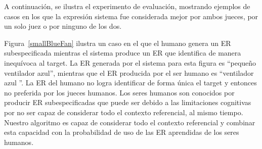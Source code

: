

A continuaci\'on, se ilustra el experimento de evaluaci\'on, mostrando ejemplos de casos en los que la expresi\'on sistema fue considerada mejor por ambos jueces, por un solo juez o por ninguno de los dos.

Figura~\ref{smallBlueFan} ilustra un caso en el que el humano genera un ER subespecificada mientras el sistema produce un ER que identifica de manera inequ\'{i}voca al target. La ER generada por el sistema para esta figura es ``peque\~no ventilador azul'', mientras que el ER producida por el ser humano es ``ventilador azul ''. La ER del humano no logra identificar de forma \'unica el target y entonces no preferida por los jueces humanos. Los seres humanos son conocidos por producir ER subespecificadas que puede ser debido a las limitaciones cognitivas por no ser capaz de considerar todo el contexto referencial, al mismo tiempo. Nuestro algoritmo es capaz de considerar todo el contexto referencial y combinar esta capacidad con la probabilidad de uso de las ER aprendidas de los seres humanos.




